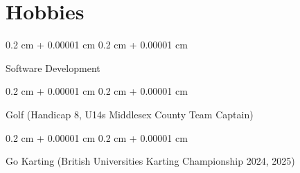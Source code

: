 \documentclass[10pt, letterpaper]{article}
\newenvironment{onecolentry}{
    \begin{adjustwidth}{
        0.2 cm + 0.00001 cm
    }{
        0.2 cm + 0.00001 cm
    }
}{
    \end{adjustwidth}
} %
\begin{document}
    
    \section{Hobbies}



        
        \begin{onecolentry}
            Software Development
        \end{onecolentry}

        \vspace{0.2 cm}

        \begin{onecolentry}
            Golf (Handicap 8, U14s Middlesex County Team Captain)
        \end{onecolentry}

        \vspace{0.2 cm}

        \begin{onecolentry}
            Go Karting (British Universities Karting Championship 2024, 2025)
        \end{onecolentry}


    
\end{document}
